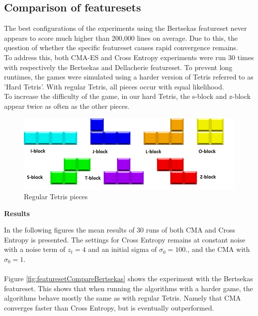 \subsection{Comparison of featuresets  \label{compoffeatureset}}

The best configurations of the experiments using the Bertsekas
featureset never appears to score much higher than 200,000 lines
on average. Due to this, the question of whether the specific featureset
causes rapid convergence remains.\\
To address this, both CMA-ES and Cross
Entropy experiments were run 30 times with respectively the Bertsekas and 
Dellacherie featureset. To prevent long runtimes, the games were simulated
using a harder version of Tetris referred to as 'Hard Tetris'. With regular 
Tetris, all pieces occur with equal likelihood.\\
To increase the difficulty of the game,
in our hard Tetris, the s-block and z-block appear twice as often 
as the other pieces.

\begin{figure}[H]
\begin{center}
\includegraphics[scale=0.6]{img/Pieces}
\end{center}
\caption{Regular Tetris pieces \label{fig:TetrisPieces}}
\end{figure}

\textbf{Results}

In the following figures the mean results of 30 runs of both CMA and Cross 
Entropy is presented. The settings for Cross Entropy remains at constant noise
with a noise term of $z_t = 4$ and an initial sigma of $\sigma_0 = 100.$, 
and the CMA with $\sigma_0 = 1$.\\
\\
Figure \ref{fig:featuresetCompareBertsekas} shows the experiment with the 
Bertsekas featureset. This shows that when running the algorithms with a
harder game, the algorithms behave mostly the same as with regular 
Tetris. Namely that CMA converges faster than Cross Entropy, 
but is eventually outperformed.

